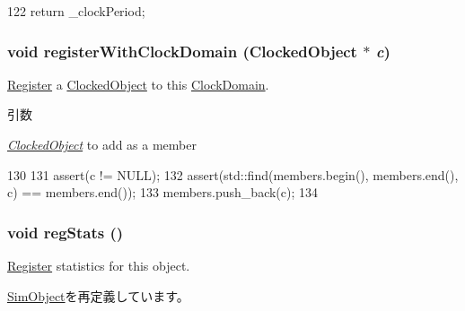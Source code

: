 \begin{DoxyCode}
122 { return _clockPeriod; }
\end{DoxyCode}
\hypertarget{classClockDomain_a386264c9090d0bf67b5bfd6dc3dab4c7}{
\subsubsection[{registerWithClockDomain}]{\setlength{\rightskip}{0pt plus 5cm}void registerWithClockDomain ({\bf ClockedObject} $\ast$ {\em c})}}
\label{classClockDomain_a386264c9090d0bf67b5bfd6dc3dab4c7}
\hyperlink{classRegister}{Register} a \hyperlink{classClockedObject}{ClockedObject} to this \hyperlink{classClockDomain}{ClockDomain}.


\begin{DoxyParams}{引数}
\item[{\em \hyperlink{classClockedObject}{ClockedObject}}]to add as a member \end{DoxyParams}



\begin{DoxyCode}
130     {
131         assert(c != NULL);
132         assert(std::find(members.begin(), members.end(), c) == members.end());
133         members.push_back(c);
134     }
\end{DoxyCode}
\hypertarget{classClockDomain_a4dc637449366fcdfc4e764cdf12d9b11}{
\subsubsection[{regStats}]{\setlength{\rightskip}{0pt plus 5cm}void regStats ()}}
\label{classClockDomain_a4dc637449366fcdfc4e764cdf12d9b11}
\hyperlink{classRegister}{Register} statistics for this object. 

\hyperlink{classSimObject_a4dc637449366fcdfc4e764cdf12d9b11}{SimObject}を再定義しています。


